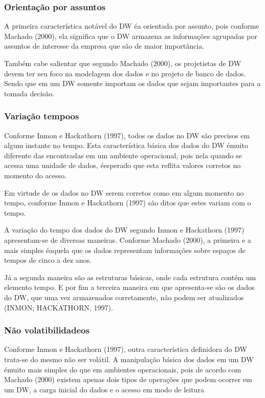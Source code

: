 \subsubsection{Orientação por assuntos}

A primeira característica notável do DW \'{e}a orientada por assunto, pois conforme Machado (2000), ela significa que o DW armazena as informações agrupadas por assuntos de interesse da empresa que são de maior importância.

Também cabe salientar que segundo Machado (2000), os projetistas de DW devem ter seu foco na modelagem dos dados e no projeto de banco de dados. Sendo que em um DW somente importam os dados que sejam importantes para a tomada decisão.

\subsubsection{Variação tempoos}

Conforme Inmon e Hackathorn (1997), todos os dados no DW são precisos em algum instante no tempo. Esta característica básica dos dados do DW \'{e}muito diferente das encontradas em um ambiente operacional, pois nela quando se acessa uma unidade de dados, \'{e}esperado que esta reflita valores corretos no momento do acesso.

Em virtude de os dados no DW serem corretos como em algum momento no tempo, conforme Inmon e Hackathorn (1997) são ditos que estes variam com o tempo.

A variação do tempo dos dados do DW segundo Inmon e Hackathorn (1997) apresentam-se de diversas maneiras. Conforme Machado (2000), a primeira e a mais simples \'{e}aquela que os dados representam informações sobre espaços de tempos de cinco a dez anos.

Já a segunda maneira são as estruturas básicas, onde cada estrutura contém um elemento tempo. E por fim a terceira maneira em que apresenta-se são os dados do DW, que uma vez armazenados corretamente, não podem ser atualizados (INMON; HACKATHORN, 1997).

\subsubsection{Não volatibilidadeos}

Conforme Inmon e Hackathorn (1997), outra característica definidora do DW trata-se do mesmo não ser volátil. A manipulação básica dos dados em um DW \'{e}muito mais simples do que em ambientes operacionais, pois de acordo com Machado (2000) existem apenas dois tipos de operações que podem ocorrer em um DW, a carga inicial do dados e o acesso em modo de leitura

